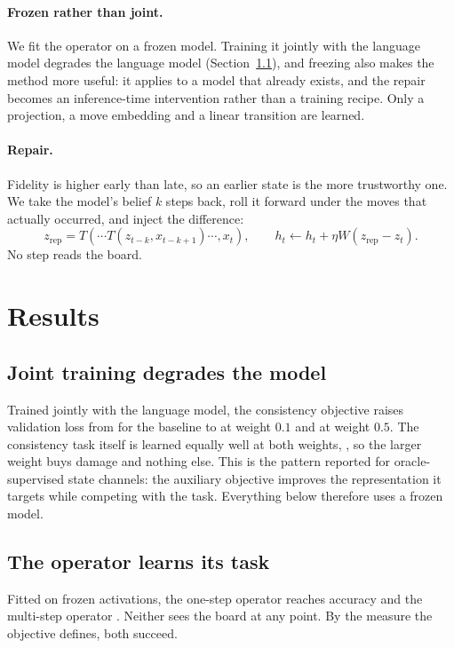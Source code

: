 \documentclass[11pt]{article}
\begin{document}
\paragraph{Frozen rather than joint.} We fit the operator on a frozen model.
Training it jointly with the language model degrades the language model
(Section~\ref{sec:joint}), and freezing also makes the method more useful: it
applies to a model that already exists, and the repair becomes an inference-time
intervention rather than a training recipe. Only a projection, a move embedding
and a linear transition are learned.

\paragraph{Repair.} Fidelity is higher early than late, so an earlier state is
the more trustworthy one. We take the model's belief $k$ steps back, roll it
forward under the moves that actually occurred, and inject the difference:
\[
z_{\mathrm{rep}} = T(\cdots T(z_{t-k}, x_{t-k+1})\cdots, x_t), \qquad
h_t \leftarrow h_t + \eta W (z_{\mathrm{rep}} - z_t).
\]
No step reads the board.

\section{Results}

\subsection{Joint training degrades the model}
\label{sec:joint}

Trained jointly with the language model, the consistency objective raises
validation loss from  for the baseline to  at
weight $0.1$ and  at weight $0.5$. The consistency task
itself is learned equally well at both weights, , so the
larger weight buys damage and nothing else. This is the pattern reported for
oracle-supervised state channels: the auxiliary objective improves the
representation it targets while competing with the task. Everything below
therefore uses a frozen model.

\subsection{The operator learns its task}

Fitted on frozen activations, the one-step operator reaches 
accuracy and the multi-step operator . Neither sees the board
at any point. By the measure the objective defines, both succeed.
\end{document}
